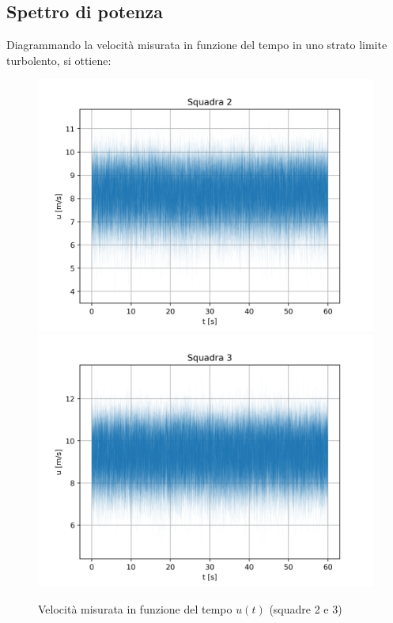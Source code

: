\subsection{Spettro di potenza}
Diagrammando la velocità misurata in funzione del tempo in uno strato limite turbolento, si ottiene:
\begin{figure}[H]
    \centering
    \includegraphics[width=.49\textwidth]{images/9/sq2timeseries.png}
    \includegraphics[width=.49\textwidth]{images/9/sq3timeseries.png}
    \caption{Velocità misurata in funzione del tempo $u(t)$ (squadre 2 e 3)}
\end{figure}

